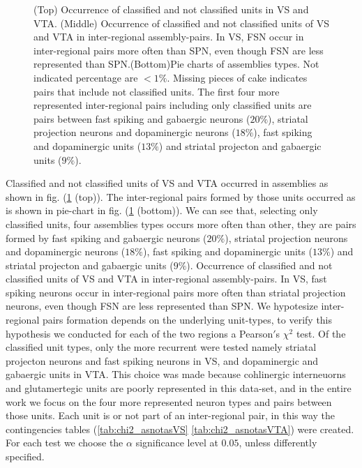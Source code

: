 \begin{figure}[H]
    \caption{(Top) Occurrence of classified and not classified units in VS and VTA. (Middle) Occurrence of classified and not classified units of VS and VTA in inter-regional assembly-pairs. In VS, FSN occur in inter-regional pairs more often than SPN, even though FSN are less represented than SPN.(Bottom)Pie charts of assemblies types. Not indicated percentage are $<1\%$. Missing pieces of cake indicates pairs that include not classified units. The first four more represented inter-regional pairs including only classified units are pairs between fast spiking and gabaergic neurons ($20\%$), striatal projection neurons and dopaminergic neurons ($18\%$), fast spiking and dopaminergic units ($13\%$) and striatal projecton and gabaergic units ($9\%$). }
    \label{fig:PieAssembliesTot}
\end{figure}
Classified and not classified units of VS and VTA occurred in assemblies as shown in fig. (\ref{fig:PieAssembliesTot} (top)). The inter-regional pairs formed by those units occurred as is shown in pie-chart in fig. (\ref{fig:PieAssembliesTot} (bottom)). We can see that, selecting only classified units, four assemblies types occurs more often than other, they are pairs formed by fast spiking and gabaergic neurons ($20\%$), striatal projection neurons and dopaminergic neurons ($18\%$), fast spiking and dopaminergic units ($13\%$) and striatal projecton and gabaergic units ($9\%$). Occurrence of classified and not classified units of VS and VTA in inter-regional assembly-pairs. In VS, fast spiking neurons occur in inter-regional pairs more often than striatal projection neurons, even though FSN are less represented than SPN. We hypotesize inter-regional pairs formation depends on the underlying unit-types, to verify this hypothesis we conducted for each of the two regions a Pearson$'$s $\chi^2$ test. Of the classified unit types, only the more recurrent were tested namely striatal projecton neurons and fast spiking neurons in VS, and dopaminergic and gabaergic units in VTA. This choice was made because cohlinergic interneuorns and glutamertegic units are poorly represented in this data-set, and in the entire work we focus on the four more represented neuron types and pairs between those units. Each unit is or not part of an inter-regional pair, in this way the contingencies tables (\ref{tab:chi2_asnotasVS} \ref{tab:chi2_asnotasVTA}) were created. For each test we choose the $\alpha$ significance level at $0.05$, unless differently specified.
